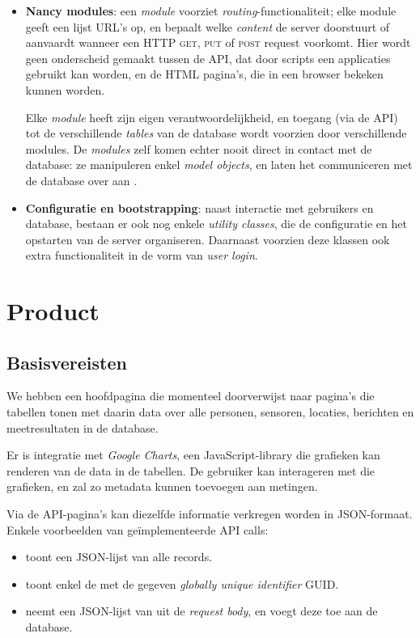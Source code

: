 \documentclass[12pt,a4paper]{article}
\begin{document}
\begin{itemize}
\item \textbf{Nancy modules}: een \emph{module} voorziet 
\emph{routing}-functionaliteit; elke module geeft een lijst URL's op, en 
bepaalt welke \emph{content} de server doorstuurt of aanvaardt wanneer een HTTP 
\textsc{get}, \textsc{put} of \textsc{post} request voorkomt. Hier wordt geen 
onderscheid gemaakt tussen de API, dat door scripts een applicaties gebruikt 
kan worden, en de HTML pagina's, die in een browser bekeken kunnen worden.

Elke \emph{module} heeft zijn eigen verantwoordelijkheid, en toegang (via de 
API) tot de verschillende \emph{tables} van de database wordt voorzien door 
verschillende modules. De \emph{modules} zelf komen echter nooit direct in 
contact met de database: ze manipuleren enkel \emph{model objects}, en laten 
het communiceren met de database over aan .

\item \textbf{Configuratie en bootstrapping}: naast interactie met gebruikers en database, bestaan er ook nog enkele \emph{utility classes}, die de configuratie en het opstarten van de server organiseren. Daarnaast voorzien deze klassen ook extra functionaliteit in de vorm van \emph{user login}. 

\end{itemize}
\section{Product}

\subsection{Basisvereisten}
We hebben een hoofdpagina die momenteel doorverwijst naar 
pagina's die tabellen tonen met daarin data over alle personen, sensoren, 
locaties, berichten en meetresultaten 
in de database.

Er is integratie met \textit{Google Charts}, een JavaScript-library die 
grafieken kan 
renderen van de data in de tabellen. De gebruiker kan interageren met die 
grafieken, en zal zo metadata kunnen toevoegen aan metingen.

Via de API-pagina's kan diezelfde informatie verkregen worden 
in JSON-formaat. Enkele voorbeelden van ge\"implementeerde API calls:
\begin{itemize}
  \item {} toont een JSON-lijst van alle  
  records.
  \item {} toont enkel de 
  met de 
  gegeven \textit{globally unique identifier} GUID.
  \item {} neemt een JSON-lijst van  
  uit de \textit{request body}, en voegt deze toe aan de database.
\end{itemize}
\end{document}

